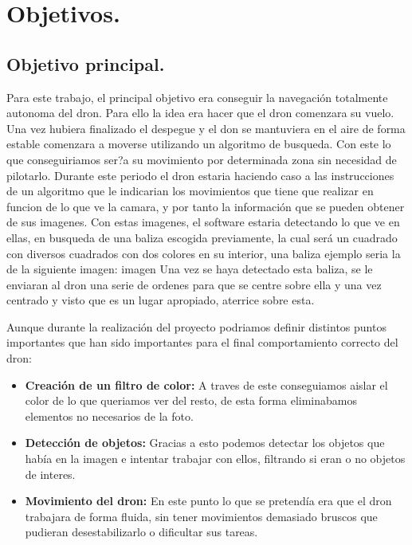 \documentclass{article}
\begin{document}
 


\newpage

\section{Objetivos.}

\subsection{Objetivo principal.}
\hspace{1 cm} Para este trabajo, el principal objetivo era conseguir la navegaci\'on totalmente autonoma del dron. Para ello la idea era hacer que el dron comenzara su vuelo. Una vez hubiera finalizado el despegue y el don se mantuviera en el aire de forma estable comenzara a moverse utilizando un algoritmo de busqueda. Con este lo que conseguiriamos ser?a su movimiento por determinada zona sin necesidad de pilotarlo. Durante este periodo el dron estaria haciendo caso a las instrucciones de un algoritmo que le indicarian los movimientos que tiene que realizar en funcion de lo que ve la camara, y por tanto la informaci\'on que se pueden obtener de sus imagenes. Con estas imagenes, el software estaria detectando lo que ve en ellas, en busqueda de una baliza escogida previamente, la cual ser\'a un cuadrado con diversos cuadrados con dos colores en su interior, una baliza ejemplo seria la de la siguiente imagen: 
\newline
imagen
\newline
Una vez se haya detectado esta baliza, se le enviaran al dron una serie de ordenes para que se centre sobre ella y una vez centrado y visto que es un lugar apropiado, aterrice sobre esta. 

\hspace{1 cm} Aunque durante la realizaci\'on del proyecto podriamos definir distintos puntos importantes que han sido importantes para el final comportamiento correcto del dron:
\begin{itemize}
	\item \textbf{Creaci\'on de un filtro de color:} A traves de este conseguiamos aislar el color de lo que queriamos ver del resto, de esta forma eliminabamos elementos no necesarios de la foto.
	\item \textbf{Detecci\'on de objetos: } Gracias a esto podemos detectar los objetos que hab\'ia en la imagen e intentar trabajar con ellos, filtrando si eran o no objetos de interes.
	\item \textbf{Movimiento del dron: } En este punto lo que se pretend\'ia era que el dron trabajara de forma fluida, sin tener movimientos demasiado bruscos que pudieran desestabilizarlo o dificultar sus tareas. 
\end{itemize}
\end{document}
